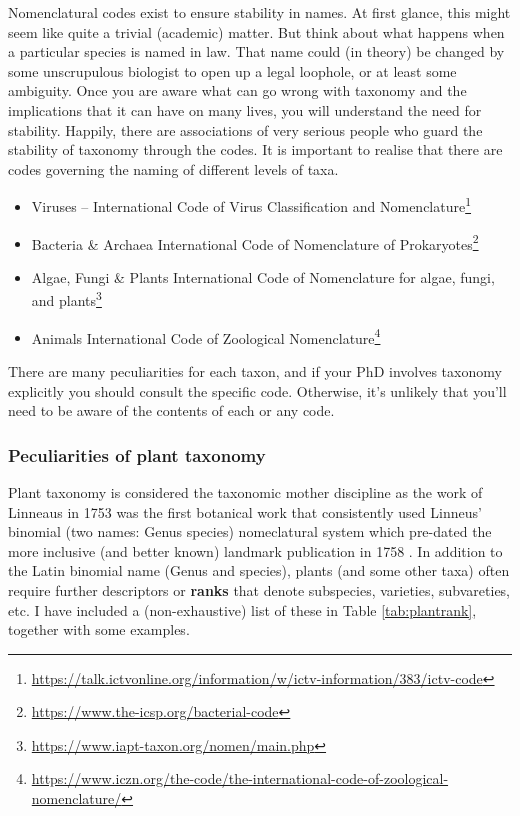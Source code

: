 \documentclass[
]{krantz}
\providecommand{\tightlist}{%
  \setlength{\itemsep}{0pt}\setlength{\parskip}{0pt}}
\renewcommand{\href}[2]{#2\footnote{\url{#1}}}
\begin{document}
Nomenclatural codes exist to ensure stability in names. At first glance, this might seem like quite a trivial (academic) matter. But think about what happens when a particular species is named in law. That name could (in theory) be changed by some unscrupulous biologist to open up a legal loophole, or at least some ambiguity. Once you are aware what can go wrong with taxonomy and the implications that it can have on many lives, you will understand the need for stability. Happily, there are associations of very serious people who guard the stability of taxonomy through the codes. It is important to realise that there are codes governing the naming of different levels of taxa.

\begin{itemize}
\tightlist
\item
  Viruses -- \href{https://talk.ictvonline.org/information/w/ictv-information/383/ictv-code}{International Code of Virus Classification and Nomenclature}
\item
  Bacteria \& Archaea \href{https://www.the-icsp.org/bacterial-code}{International Code of Nomenclature of Prokaryotes}
\item
  Algae, Fungi \& Plants \href{https://www.iapt-taxon.org/nomen/main.php}{International Code of Nomenclature for algae, fungi, and plants}
\item
  Animals \href{https://www.iczn.org/the-code/the-international-code-of-zoological-nomenclature/}{International Code of Zoological Nomenclature}
\end{itemize}

There are many peculiarities for each taxon, and if your PhD involves taxonomy explicitly you should consult the specific code. Otherwise, it's unlikely that you'll need to be aware of the contents of each or any code.

\hypertarget{peculiarities-of-plant-taxonomy}{%
\subsubsection{Peculiarities of plant taxonomy}\label{peculiarities-of-plant-taxonomy}}

Plant taxonomy is considered the taxonomic mother discipline as the work of Linneaus in 1753 was the first botanical work that consistently used Linneus' binomial (two names: Genus species) nomeclatural system \citep{linnaeus1753species} which pre-dated the more inclusive (and better known) landmark publication in 1758 \citep{linnaeus1758systema}. In addition to the Latin binomial name (Genus and species), plants (and some other taxa) often require further descriptors or \textbf{ranks} that denote subspecies, varieties, subvareties, etc. I have included a (non-exhaustive) list of these in Table \ref{tab:plantrank}, together with some examples.
\end{document}
